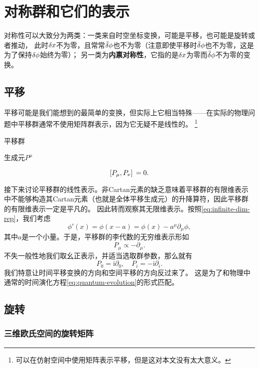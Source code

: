 \documentclass[hyperref, UTF8, a4paper]{ctexart}
\newcommand*{\ii}{\mathrm{i}}
\begin{document}
\section{对称群和它们的表示}\label{sec:symmetry}

对称性可以大致分为两类：一类来自时空坐标变换，可能是平移，也可能是旋转或者推动，
此时$\var{x}$不为零，且常常$\bar{\var}{\phi}$也不为零（注意即使平移时$\bar{\var}{\phi}$也不为零，这是为了保持$\var{\phi}$始终为零）；
另一类为\textbf{内禀对称性}，它指的是$\var{x}$为零而$\bar{\var}{\phi}$不为零的变换。

\subsection{平移}\label{sec:translation}

平移可能是我们能想到的最简单的变换，但实际上它相当特殊——在实际的物理问题中平移群通常不使用矩阵群表示，因为它无疑不是线性的。%
\footnote{可以在仿射空间中使用矩阵表示平移，但是这对本文没有太大意义。}

平移群

生成元$P^\mu$

\begin{equation}
    \comm*{P_\mu}{P_\nu} = 0.
    \label{eq:comm-of-trans}
\end{equation}

接下来讨论平移群的线性表示。非Cartan元素的缺乏意味着平移群的有限维表示中不能够构造其Cartan元素（也就是全体平移生成元）的升降算符，因此平移群的有限维表示一定是平凡的。
因此转而观察其无限维表示。按照\eqref{eq:infinite-dim-rep}，我们考虑
\[
    \phi'(x) = \phi(x - a) = \phi(x) - a^\mu \partial_\mu \phi,
\]
其中$a$是一个小量。于是，平移群的李代数的无穷维表示形如
\[
    P_\mu \propto - \partial_\mu.
\]
不失一般性地我们取幺正表示，并适当选取群参数，那么就有
\begin{equation}
    P_0 = \ii \partial_0, \quad P_i = - \ii \partial_i.
    \label{eq:transition-inf-rep}
\end{equation}
我们特意让时间平移变换的方向和空间平移的方向反过来了。
这是为了和物理中通常的时间演化方程\eqref{eq:quantum-evolution}的形式匹配。

\subsection{旋转}\label{sec:rotation}

\subsubsection{三维欧氏空间的旋转矩阵}
\end{document}
